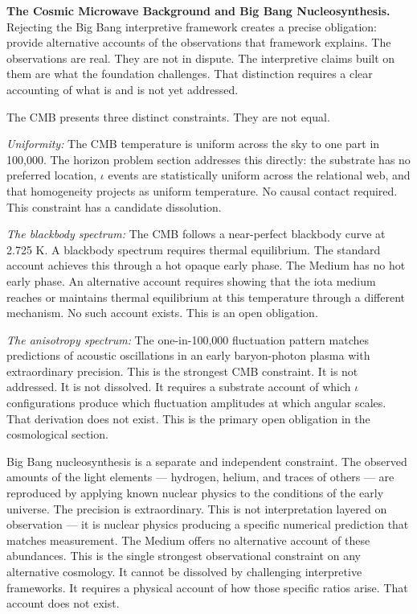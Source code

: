 \documentclass[11pt,letterpaper]{article}
\begin{document}
\textbf{The Cosmic Microwave Background and Big Bang Nucleosynthesis.} Rejecting the Big Bang interpretive framework creates a precise obligation: provide alternative accounts of the observations that framework explains. The observations are real. They are not in dispute. The interpretive claims built on them are what the foundation challenges. That distinction requires a clear accounting of what is and is not yet addressed.

The CMB presents three distinct constraints. They are not equal.

\emph{Uniformity:} The CMB temperature is uniform across the sky to one part in 100,000. The horizon problem section addresses this directly: the substrate has no preferred location, \(\iota\) events are statistically uniform across the relational web, and that homogeneity projects as uniform temperature. No causal contact required. This constraint has a candidate dissolution.

\emph{The blackbody spectrum:} The CMB follows a near-perfect blackbody curve at 2.725 K. A blackbody spectrum requires thermal equilibrium. The standard account achieves this through a hot opaque early phase. The Medium has no hot early phase. An alternative account requires showing that the iota medium reaches or maintains thermal equilibrium at this temperature through a different mechanism. No such account exists. This is an open obligation.

\emph{The anisotropy spectrum:} The one-in-100,000 fluctuation pattern matches predictions of acoustic oscillations in an early baryon-photon plasma with extraordinary precision. This is the strongest CMB constraint. It is not addressed. It is not dissolved. It requires a substrate account of which \(\iota\) configurations produce which fluctuation amplitudes at which angular scales. That derivation does not exist. This is the primary open obligation in the cosmological section.

Big Bang nucleosynthesis is a separate and independent constraint. The observed amounts of the light elements --- hydrogen, helium, and traces of others --- are reproduced by applying known nuclear physics to the conditions of the early universe. The precision is extraordinary. This is not interpretation layered on observation --- it is nuclear physics producing a specific numerical prediction that matches measurement. The Medium offers no alternative account of these abundances. This is the single strongest observational constraint on any alternative cosmology. It cannot be dissolved by challenging interpretive frameworks. It requires a physical account of how those specific ratios arise. That account does not exist.
\end{document}
